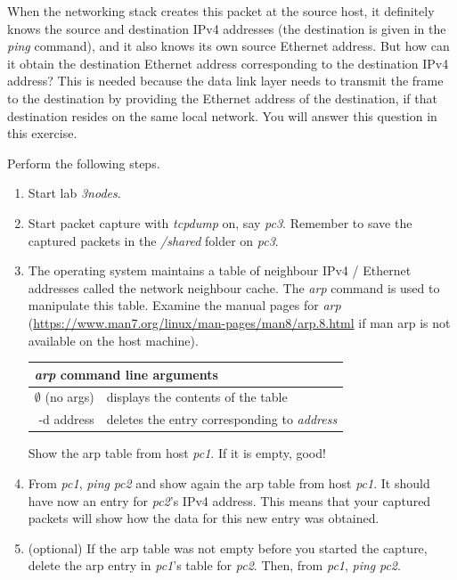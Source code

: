 \documentclass[12pt]{book}
\begin{document}
\begin{enumerate}[label=\arabic*.]
\begin{enumerate}
 When the networking stack creates this packet at the source host, it definitely knows the source and destination IPv4 addresses (the destination is given in the \emph{ping} command), and it also knows its own source Ethernet address. But how can it obtain the destination Ethernet address corresponding to the destination IPv4 address? This is needed because the data link layer needs to transmit the frame to the destination by providing the Ethernet address of the destination, if that destination resides on the same local network. You will answer this question in this exercise.

  Perform the following steps.
  \begin{enumerate}[label=(\roman*)]
  \item\label{first.1} Start lab \emph{3nodes}.
  \item Start packet capture with \emph{tcpdump} on, say \emph{pc3}. Remember to save the captured packets in the \emph{/shared} folder on \emph{pc3}.
  \item The operating system maintains a table of neighbour IPv4 / Ethernet addresses called the network neighbour cache. The \emph{arp} command is used to manipulate this table. Examine the manual pages for \emph{arp} (\url{https://www.man7.org/linux/man-pages/man8/arp.8.html} if man arp is not available on the host machine).

    \smallskip
    \begin{tabularx}{0.9\textwidth}{r l} \toprule
      \multicolumn{2}{l}{\emph{arp} command line arguments} \\ \midrule
      $\emptyset$ (no args) & displays the contents of the table \\
      -d address & deletes the  entry corresponding to \emph{address} \\ \bottomrule
    \end{tabularx}
    \smallskip

    Show the arp table from host \emph{pc1}. If it is empty, good!
    
  \item From \emph{pc1}, \emph{ping} \emph{pc2} and show again the arp table from host \emph{pc1}. It should have now an entry for \emph{pc2}'s IPv4 address. This means that your captured packets will show how the data for this new entry was obtained.
    
  \item (optional) If the arp table was not empty before you started the capture, delete the arp entry in \emph{pc1}'s table for \emph{pc2}. Then, from \emph{pc1}, \emph{ping} \emph{pc2}.


\end{enumerate}
\end{enumerate}
\end{enumerate}
\end{document}
